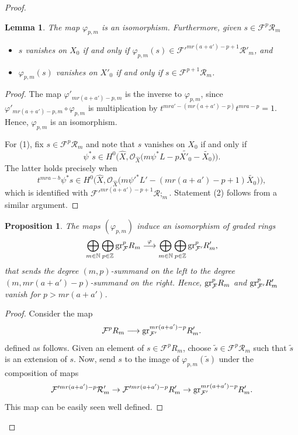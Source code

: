\documentclass[12pt,reqno]{amsart}%
\newcommand{\cR}{{\mathcal{R}}}
\newcommand{\cF}{\mathcal{F}}
\newcommand{\gr}{{\rm gr}}
\newtheorem{lem}[thm]{Lemma}
\newtheorem{prop}[thm]{Proposition}
\theoremstyle{definition}
\theoremstyle{remark}
\newcommand{\cO}{{\mathcal{O}}}
\newcommand{\N}{{\mathbb{N}}}
\begin{document}
\begin{proof}
\begin{lem}\label{l-Fcompare}
The map $\varphi_{p,m}$ is an isomorphism. Furthermore, given $s\in \cF^{p} \cR_m$
\begin{itemize}
\item[(1)] $s$ vanishes on $X_0$ if and only if $\varphi_{p,m}(s) \in \cF'^{mr(a+a')-p+1} \cR'_m$, and
\item[(2)]    $\varphi_{p,m}(s)$ vanishes on $X'_0$ if and only if $s\in \cF^{p+1} \cR_m$.
\end{itemize}
\end{lem}
\begin{proof}
The map $\varphi'_{mr(a+a')-p,m}$ is the inverse to $\varphi_{p,m}$, since
 $\varphi'_{mr(a+a')-p,m}\circ \varphi_{p,m}$ is multiplication by $t^{mra'-(mr(a+a')-p) }t^{mra-p}=1$. 
 Hence, $\varphi_{p,m}$ is an isomorphism. 
 
For (1), fix $s\in \cF^{p} \cR_m$ and note that $s$ vanishes on $X_0$ if and only if 
$$
\psi^*s \in H^0\Big(\widehat{X}, \cO_{\widehat{X}} \big( m \psi^* L -p \widetilde{X'_0} -  \widetilde{X_0} \big) \Big)
.$$
 The latter holds precisely when
  \[t^{mra-b}\psi^*s
  \in H^0\Big(
  \widehat{X}, \cO_{\widehat{X}} \big(m \psi'^* L' - (mr(a+a')-p +1) \widetilde{X_0} \big)\Big),\]
 which is identified with $\cF'^{mr(a+a')-p +1 }\cR;_m$. Statement (2) follows from a similar argument. 
 \end{proof}
 
 
 \begin{prop}\label{p-isomgrF}
 The maps $(\varphi_{p,m})$ induce an isomorphism of graded rings 
 \begin{eqnarray}\label{e-graded}
\bigoplus_{ m\in \N  }  \bigoplus_{p\in \mathbb{Z} }{\rm gr}_\cF^p R_m 
\overset{\varphi}{\longrightarrow}
 \bigoplus_{m \in \N } \bigoplus_{p \in \mathbb{Z}} {\rm gr}_{\cF'}^{p}R'_m ,
 \end{eqnarray}
that sends the degree $(m,p)$-summand on the left to the degree $(m,mr(a+a')-p)$-summand on the right. 
Hence, 
 $ {\rm gr}_\cF^p R_m$ and ${\rm gr}_{\cF'}^p R'_m$ vanish for $p>mr(a+a')$. 
 \end{prop}

   
   \begin{proof}
Consider the map
   \begin{equation}\label{e-FF'}
   \cF^p R_m \longrightarrow \gr_{\cF'}^{mr(a+a')-p} R'_m. 
   \end{equation}
 defined as follows.
Given an element of $s\in \cF^p R_m$, choose $\tilde{s} \in \cF^p \cR_m$ such that $\tilde{s}$ is an extension of $s$. 
Now, send $s$ to the image of $\varphi_{p,m}(\tilde{s})$ under the composition of maps 
\[
\cF'^{mr(a+a') - p } \cR'_m \to \cF'^{mr(a+a') - p } R'_m \to \gr_{\cF'}^{mr(a+a')-p} R'_m.
\]
This map can be easily seen well defined.


\end{proof}
\end{proof}
\end{document}
